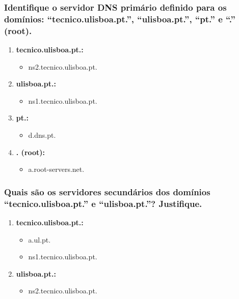 \subsubsection{Identifique o servidor DNS primário definido para os domínios: “tecnico.ulisboa.pt.”,
“ulisboa.pt.”, “pt.” e “.” (root).}

\begin{enumerate}
    \item \textbf{tecnico.ulisboa.pt.:}
        \begin{itemize}
            \item ns2.tecnico.ulisboa.pt.
        \end{itemize}
    \item \textbf{ulisboa.pt.:}
        \begin{itemize}
            \item ns1.tecnico.ulisboa.pt.
        \end{itemize}
    \item \textbf{pt.:}
    \begin{itemize}
        \item d.dns.pt.
    \end{itemize}
    \item \textbf{. (root):}
    \begin{itemize}
        \item a.root-servers.net.
    \end{itemize}
\end{enumerate}

\subsubsection{Quais são os servidores secundários dos domínios “tecnico.ulisboa.pt.” e “ulisboa.pt.”?
Justifique.}

\begin{enumerate}
    \item \textbf{tecnico.ulisboa.pt.:}
        \begin{itemize}
            \item a.ul.pt.
            \item ns1.tecnico.ulisboa.pt.
        \end{itemize}
    \item \textbf{ulisboa.pt.:}
        \begin{itemize}
            \item ns2.tecnico.ulisboa.pt.
        \end{itemize}
\end{enumerate}



